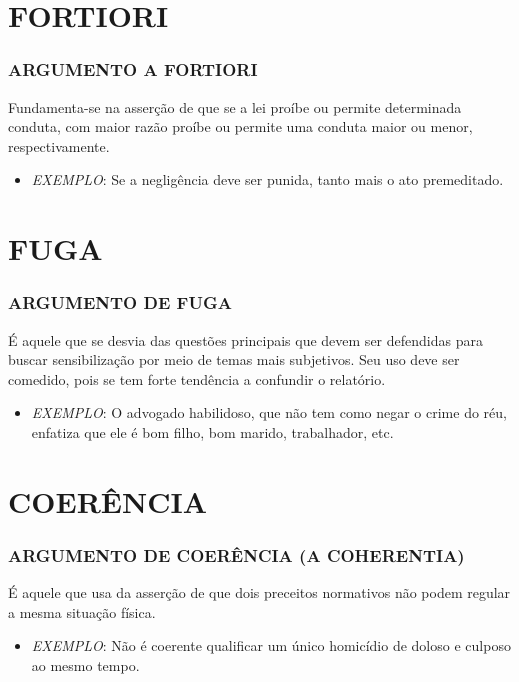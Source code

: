 \documentclass[aspectratio=1610]{beamer}
\begin{document}
\section {FORTIORI}
\begin{frame}
  \frametitle{ARGUMENTO A FORTIORI   }
\begin{center}
Fundamenta-se na asserção de que se a lei proíbe ou permite determinada conduta, com maior razão proíbe ou permite uma conduta maior ou menor, respectivamente.
\end{center}

\begin{itemize}
  \item \textit{EXEMPLO}: Se a negligência deve ser punida, tanto mais o ato premeditado.
\end{itemize}
\end{frame}

\section {FUGA}
\begin{frame}
  \frametitle{ARGUMENTO DE FUGA   }
\begin{center}
É aquele que se desvia das questões principais que devem ser defendidas para buscar sensibilização por meio de temas mais subjetivos. Seu uso deve ser comedido, pois se tem forte tendência a confundir o relatório.
\end{center}

\begin{itemize}
  \item \textit{EXEMPLO}: O advogado habilidoso, que não tem como negar o crime do réu, enfatiza que ele é bom filho, bom marido, trabalhador, etc.
\end{itemize}
\end{frame}

\section {COERÊNCIA}
\begin{frame}
  \frametitle{ARGUMENTO DE COERÊNCIA (A COHERENTIA)   }
\begin{center}
É aquele que usa da asserção de que dois preceitos normativos não podem regular a mesma situação física.
\end{center}

\begin{itemize}
  \item \textit{EXEMPLO}: Não é coerente qualificar um único homicídio de doloso e culposo ao mesmo tempo.
\end{itemize}
\end{frame}
\end{document}
